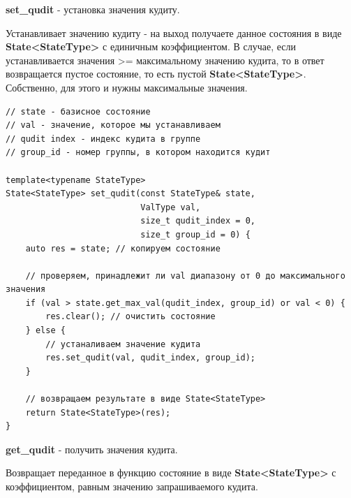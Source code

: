 \documentclass[12pt,fleqn]{article}
\begin{document}
        \begin{center}
            \textbf{set\_qudit} - установка значения кудиту.
        \end{center}

        Устанавливает значению кудиту - на выход получаете данное состояния в виде \newline \textbf{State<StateType>} с единичным коэффициентом.
         В случае, если устанавливается значения >= максимальному значению кудита, то в ответ возвращается пустое состояние, то есть пустой \textbf{State<StateType>}.
        Собственно, для этого и нужны максимальные значения.

\begin{mdframed}[linecolor=black, topline=true, bottomline=true,
leftline=false, rightline=false]
\begin{verbatim}
// state - базисное состояние
// val - значение, которое мы устанавливаем
// qudit index - индекс кудита в группе
// group_id - номер группы, в котором находится кудит

template<typename StateType>
State<StateType> set_qudit(const StateType& state,
                           ValType val,
                           size_t qudit_index = 0,
                           size_t group_id = 0) {
    auto res = state; // копируем состояние

    // проверяем, принадлежит ли val диапазону от 0 до максимального значения
    if (val > state.get_max_val(qudit_index, group_id) or val < 0) {
        res.clear(); // очистить состояние
    } else {
        // устаналиваем значение кудита
        res.set_qudit(val, qudit_index, group_id);
    }

    // возвращаем результате в виде State<StateType>
    return State<StateType>(res);
}
\end{verbatim}
\end{mdframed}

        \begin{center}
            \textbf{get\_qudit} - получить значения кудита.
        \end{center}

        Возвращает переданное в функцию состояние в виде \textbf{State<StateType>} с коэффициентом, равным значению запрашиваемого кудита.
\end{document}
